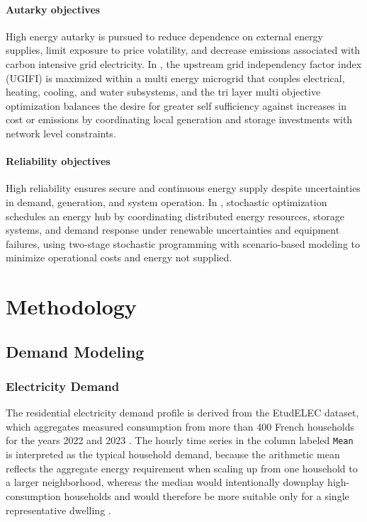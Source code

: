 \documentclass[12pt,a4paper]{report}
\begin{document}
\subsubsection{Autarky objectives}
High energy autarky is pursued to reduce dependence on external energy supplies, limit exposure to price volatility, and decrease emissions associated with carbon intensive grid electricity. In \cite{karimi2025triLayer}, the upstream grid independency factor index (UGIFI) is maximized within a multi energy microgrid that couples electrical, heating, cooling, and water subsystems, and the tri layer multi objective optimization balances the desire for greater self sufficiency against increases in cost or emissions by coordinating local generation and storage investments with network level constraints.

\subsubsection{Reliability objectives}
High reliability ensures secure and continuous energy supply despite uncertainties in demand, generation, and system operation. In \cite{FARAJI2021102578}, stochastic optimization schedules an energy hub by coordinating distributed energy resources, storage systems, and demand response under renewable uncertainties and equipment failures, using two-stage stochastic programming with scenario-based modeling to minimize operational costs and energy not supplied. 

\chapter{Methodology}
\section{Demand Modeling}
\label{sec:demand_modelling}

\subsection{Electricity Demand}
\label{subsec:electric_demand}

The residential electricity demand profile is derived from the EtudELEC dataset, which aggregates measured consumption from more than 400 French households for the years 2022 and 2023 \cite{osonuga_etudelec_2024}. The hourly time series in the column labeled \texttt{Mean} is interpreted as the typical household demand, because the arithmetic mean reflects the aggregate energy requirement when scaling up from one household to a larger neighborhood, whereas the median would intentionally downplay high-consumption households and would therefore be more suitable only for a single representative dwelling \cite{osonuga_etudelec_2024}.  
\end{document}
